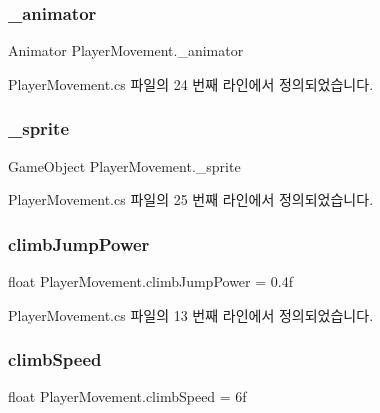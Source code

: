 \subsubsection{\texorpdfstring{\_animator}{\_animator}}
{\footnotesize\ttfamily Animator Player\+Movement.\+\_\+animator}



Player\+Movement.\+cs 파일의 24 번째 라인에서 정의되었습니다.

\mbox{\label{class_player_movement_a8d5245144cd5777ff26b1f9f448796ff}} 
\subsubsection{\texorpdfstring{\_sprite}{\_sprite}}
{\footnotesize\ttfamily Game\+Object Player\+Movement.\+\_\+sprite}



Player\+Movement.\+cs 파일의 25 번째 라인에서 정의되었습니다.

\mbox{\label{class_player_movement_a3b10fda58c5c9c3e0e00b34b531e8bf4}} 
\subsubsection{\texorpdfstring{climbJumpPower}{climbJumpPower}}
{\footnotesize\ttfamily float Player\+Movement.\+climb\+Jump\+Power = 0.\+4f}



Player\+Movement.\+cs 파일의 13 번째 라인에서 정의되었습니다.

\mbox{\label{class_player_movement_a9f24ed81b8ddd8ad2bc4c9ae45203fcd}} 
\subsubsection{\texorpdfstring{climbSpeed}{climbSpeed}}
{\footnotesize\ttfamily float Player\+Movement.\+climb\+Speed = 6f}



